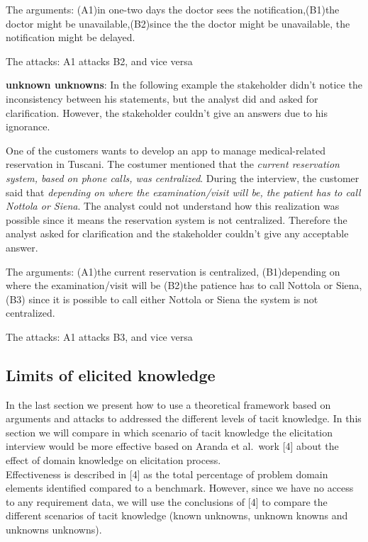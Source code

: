 \documentclass[]{llncs}
\begin{document}
The arguments: (A1)in one-two days the doctor sees the
notification,(B1)the doctor might be unavailable,(B2)since the the
doctor might be unavailable, the notification might be delayed.

The attacks: A1 attacks B2, and vice versa

\textbf{unknown unknowns}: In the following example the stakeholder
didn't notice the inconsistency between his statements, but the analyst
did and asked for clarification. However, the stakeholder couldn't give
an answers due to his ignorance.

One of the customers wants to develop an app to manage medical-related
reservation in Tuscani. The costumer mentioned that the \emph{current
reservation system, based on phone calls, was centralized}. During the
interview, the customer said that \emph{depending on where the
examination/visit will be, the patient has to call Nottola or Siena}.
The analyst could not understand how this realization was possible since
it means the reservation system is not centralized. Therefore the
analyst asked for clarification and the stakeholder couldn't give any
acceptable answer.

The arguments: (A1)the current reservation is centralized, (B1)depending
on where the examination/visit will be (B2)the patience has to call
Nottola or Siena, (B3) since it is possible to call either Nottola or
Siena the system is not centralized.

The attacks: A1 attacks B3, and vice versa

\hypertarget{limits-of-elicited-knowledge}{%
\subsection{Limits of elicited
knowledge}\label{limits-of-elicited-knowledge}}

In the last section we present how to use a theoretical framework based
on arguments and attacks to addressed the different levels of tacit
knowledge. In this section we will compare in which scenario of tacit
knowledge the elicitation interview would be more effective based on
Aranda et al.~work {[}4{]} about the effect of domain knowledge on
elicitation process.\\
Effectiveness is described in {[}4{]} as the total percentage of problem
domain elements identified compared to a benchmark. However, since we
have no access to any requirement data, we will use the conclusions of
{[}4{]} to compare the different scenarios of tacit knowledge (known
unknowns, unknown knowns and unknowns unknowns).
\end{document}
